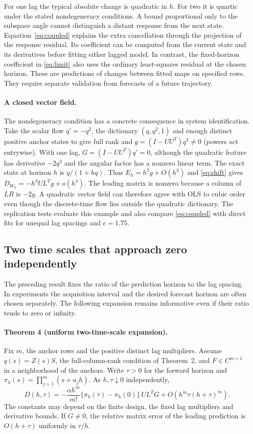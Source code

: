 For one lag the typical absolute change is quadratic in $h$. For two it is quartic under the stated nondegeneracy conditions. A bound proportional only to the subspace angle cannot distinguish a distant response from the next state. Equation~\eqref{eq:coupled} explains the extra cancellation through the projection of the response residual. Its coefficient can be computed from the current state and its derivatives before fitting either lagged model. In contrast, the fixed-horizon coefficient in \eqref{eq:limit} also uses the ordinary least-squares residual at the chosen horizon. These are predictions of changes between fitted maps on specified rows. They require separate validation from forecasts of a future trajectory.

\paragraph{A closed vector field.}
The nondegeneracy condition has a concrete consequence in system identification. Take the scalar flow $q'=-q^2$, the dictionary $(q,q^2,1)$ and enough distinct positive anchor states to give full rank and $g=(I-UU^T)q^3\ne0$ (powers act entrywise). With one lag, $G=(I-UU^T)q'=0$, although the quadratic feature has derivative $-2q^3$ and the angular factor has a nonzero linear term. The exact state at horizon $h$ is $q/(1+hq)$. Thus $E_h=h^2 g+O(h^3)$ and \eqref{eq:shift} gives $D_{W_h}=-h^3 U L^T g+o(h^3)$. The leading matrix is nonzero because a column of $LR$ is $-2g$. A quadratic vector field can therefore agree with OLS to cubic order even though the discrete-time flow lies outside the quadratic dictionary. The replication tests evaluate this example and also compare \eqref{eq:coupled} with direct fits for unequal lag spacings and $c=1.75$.

\subsection{Two time scales that approach zero independently}
The preceding result fixes the ratio of the prediction horizon to the lag spacing. In experiments the acquisition interval and the desired forecast horizon are often chosen separately. The following expansion remains informative even if their ratio tends to zero or infinity.

\paragraph{Theorem 4 (uniform two-time-scale expansion).}
Fix $m$, the anchor rows and the positive distinct lag multipliers. Assume $q(s)=Z(s)S$, the full-column-rank condition of Theorem~2, and $F\in C^{m+1}$ in a neighborhood of the anchors. Write $\tau>0$ for the forward horizon and $\pi_h(s)=\prod_{j=1}^m(s+a_jh)$. As $h,\tau\downarrow0$ independently,
\begin{equation}
 D(h,\tau)=
 -\frac{\alpha h^m}{m!}\{\pi_h(\tau)-\pi_h(0)\}\,U L^TG
 +O\!\left(h^m\tau(h+\tau)^m\right). \label{eq:joint}
\end{equation}
The constants may depend on the finite design, the fixed lag multipliers and derivative bounds. If $G\ne0$, the relative matrix error of the leading prediction is $O(h+\tau)$ uniformly in $\tau/h$.

